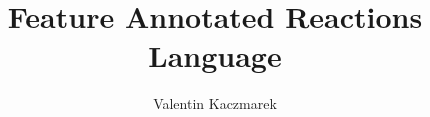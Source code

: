 \documentclass[twoside, english, final]{sdqthesis}
\author{Valentin Kaczmarek}
\title{Feature Annotated Reactions Language}
\begin{document}
\setpdf


\maketitle



\frontmatter

\setcounter{page}{1}



\begin{otherlanguage}{ngerman}
  
\end{otherlanguage}




\tableofcontents

\listoffigures
\lstlistoflistings
\listoftables


\mainmatter












\printbibliography[heading=bibintoc]
\end{document}

